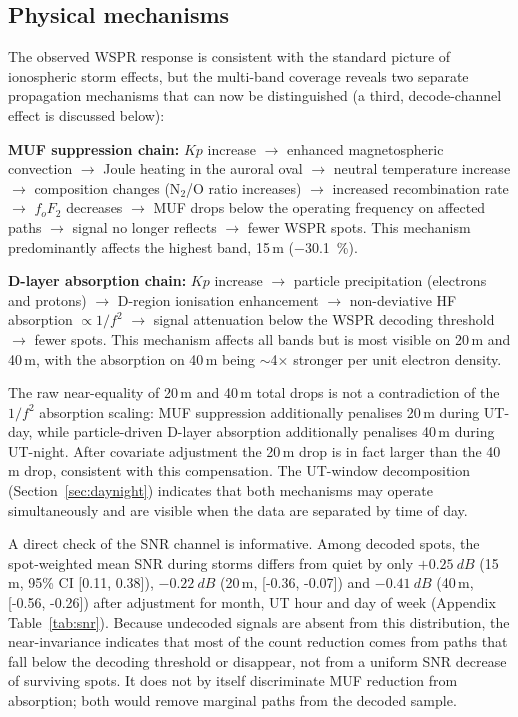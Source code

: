 \documentclass{agujournal2019}
\begin{document}
\subsection{Physical mechanisms}

The observed WSPR response is consistent with the standard picture of
ionospheric storm effects, but the multi-band coverage reveals two separate
propagation mechanisms that can now be distinguished (a third,
decode-channel effect is discussed below):

\textbf{MUF suppression chain:} $Kp$ increase $\rightarrow$ enhanced
magnetospheric convection $\rightarrow$ Joule heating in the auroral oval
$\rightarrow$ neutral temperature increase $\rightarrow$ composition changes
(N$_2$/O ratio increases) $\rightarrow$ increased recombination rate
$\rightarrow$ $f_oF_2$ decreases $\rightarrow$ MUF drops below the operating
frequency on affected paths $\rightarrow$ signal no longer reflects
$\rightarrow$ fewer WSPR spots. This mechanism predominantly affects the
highest band, 15\,m (\SI{-30.1}{\percent}).

\textbf{D-layer absorption chain:} $Kp$ increase $\rightarrow$ particle
precipitation (electrons and protons) $\rightarrow$ D-region ionisation
enhancement $\rightarrow$ non-deviative HF absorption
$\propto 1/f^2$ $\rightarrow$ signal attenuation below the WSPR decoding
threshold $\rightarrow$ fewer spots. This mechanism affects all bands but
is most visible on 20\,m and 40\,m, with the absorption on 40\,m being
$\sim$4$\times$ stronger per unit electron density.

The raw near-equality of 20\,m and 40\,m total drops is not a contradiction
of the $1/f^2$ absorption scaling: MUF suppression additionally penalises
20\,m during UT-day, while particle-driven D-layer absorption additionally
penalises 40\,m during UT-night. After covariate adjustment the 20\,m drop
is in fact larger than the 40\,m drop, consistent with this compensation.
The UT-window decomposition (Section~\ref{sec:daynight}) indicates that both
mechanisms may operate simultaneously and are visible when the data are
separated by time of day.

A direct check of the SNR channel is informative. Among decoded spots, the
spot-weighted mean SNR during storms differs from quiet by only
$+\SI{0.25}{dB}$ (15\,m, 95\% CI [0.11, 0.38]), $-\SI{0.22}{dB}$ (20\,m,
[-0.36, -0.07]) and $-\SI{0.41}{dB}$ (40\,m, [-0.56, -0.26]) after
adjustment for month, UT hour and day of week (Appendix
Table~\ref{tab:snr}). Because undecoded signals are absent from this
distribution, the near-invariance indicates that most of the count reduction
comes from paths that fall below the decoding threshold or disappear, not
from a uniform SNR decrease of surviving spots. It does not by itself
discriminate MUF reduction from absorption; both would remove marginal paths
from the decoded sample.
\end{document}
